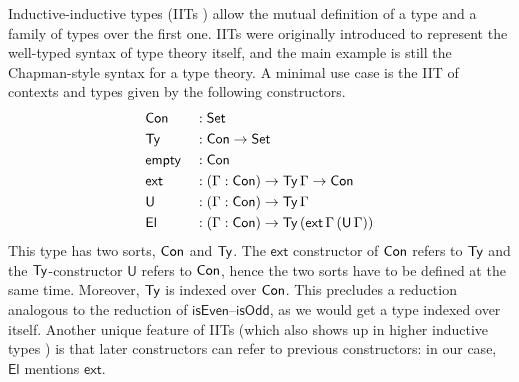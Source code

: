 \documentclass[a4paper,UKenglish,cleveref, autoref]{lipics-v2019}
\begin{document}
Inductive-inductive types (IITs \cite{forsberg-phd}) allow the mutual
definition of a type and a family of types over the first one. IITs
were originally introduced to represent the well-typed syntax of type
theory itself, and the main example is still the Chapman-style
\cite{chapman09eatitself} syntax for a type theory. A minimal use case
is the IIT of contexts and types given by the following constructors.
\begin{alignat*}{5}
  & \mathsf{Con} && : \mathsf{Set} \\
  & \mathsf{Ty} && : \mathsf{Con}\rightarrow\mathsf{Set} \\
  & \mathsf{empty} && : \mathsf{Con} \\
  & \mathsf{ext} && : (\Gamma:\mathsf{Con})\rightarrow\mathsf{Ty}\,\Gamma\rightarrow\mathsf{Con} \\
  & \mathsf{U} && : (\Gamma:\mathsf{Con})\rightarrow\mathsf{Ty}\,\Gamma \\
  & \mathsf{El} && : (\Gamma:\mathsf{Con})\rightarrow\mathsf{Ty}\,(\mathsf{ext}\,\Gamma\,(\mathsf{U}\,\Gamma))
\end{alignat*}
This type has two sorts, $\mathsf{Con}$ and $\mathsf{Ty}$. The $\mathsf{ext}$ constructor of
$\mathsf{Con}$ refers to $\mathsf{Ty}$ and the $\mathsf{Ty}$-constructor $\mathsf{U}$ refers to $\mathsf{Con}$,
hence the two sorts have to be defined at the same time. Moreover, $\mathsf{Ty}$ is
indexed over $\mathsf{Con}$. This precludes a reduction analogous to the reduction of
$\mathsf{isEven}$--$\mathsf{isOdd}$, as we would get a type indexed over
itself. Another unique feature of IITs (which also shows up in higher inductive
types \cite{HoTTbook}) is that later constructors can refer to previous
constructors: in our case, $\mathsf{El}$ mentions
$\mathsf{ext}$.
\end{document}
